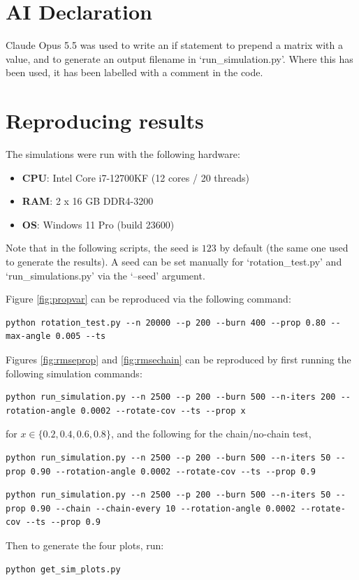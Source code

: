 \section{AI Declaration}
Claude Opus 5.5 was used to write an if statement to prepend a matrix with a value, and to generate an output filename in `run\_simulation.py'. Where this has been used, it has been labelled with a comment in the code.
\section{Reproducing results}\label{app:reproduce}
The simulations were run with the following hardware:
\begin{itemize}
    \item \textbf{CPU}: Intel Core i7-12700KF (12 cores / 20 threads)
    \item \textbf{RAM}: 2 x 16 GB DDR4-3200
    \item \textbf{OS}: Windows 11 Pro (build 23600)
\end{itemize}

Note that in the following scripts, the seed is $123$ by default (the same one used to generate the results). A seed can be set manually for `rotation\_test.py' and `run\_simulations.py' via the `--seed' argument.

Figure \ref{fig:propvar} can be reproduced via the following command:

\begin{lstlisting}[style=terminal]
    python rotation_test.py --n 20000 --p 200 --burn 400 --prop 0.80 --max-angle 0.005 --ts
\end{lstlisting}

Figures \ref{fig:rmseprop} and \ref{fig:rmsechain} can be reproduced by first running the following simulation commands:

\begin{lstlisting}[style=terminal]
    python run_simulation.py --n 2500 --p 200 --burn 500 --n-iters 200 --rotation-angle 0.0002 --rotate-cov --ts --prop x
\end{lstlisting}
for $x\in \{0.2, 0.4, 0.6, 0.8\}$, and the following for the chain/no-chain test,
\begin{lstlisting}[style=terminal]
    python run_simulation.py --n 2500 --p 200 --burn 500 --n-iters 50 --prop 0.90 --rotation-angle 0.0002 --rotate-cov --ts --prop 0.9
\end{lstlisting}
\begin{lstlisting}[style=terminal]
    python run_simulation.py --n 2500 --p 200 --burn 500 --n-iters 50 --prop 0.90 --chain --chain-every 10 --rotation-angle 0.0002 --rotate-cov --ts --prop 0.9
\end{lstlisting}
Then to generate the four plots, run:
\begin{lstlisting}[style=terminal]
    python get_sim_plots.py
\end{lstlisting}

